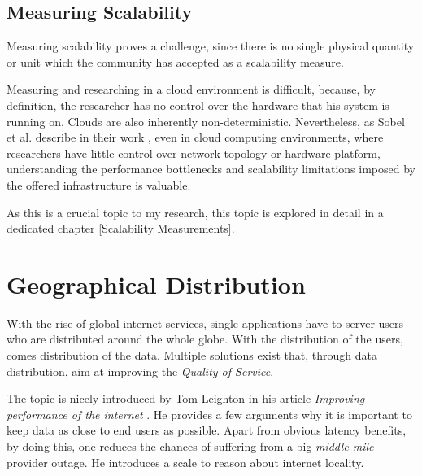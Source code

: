 \documentclass{uvamscse}
\begin{document}
\subsection{Measuring Scalability}
Measuring scalability proves a challenge, since there is no single physical quantity or unit which the community has accepted as a scalability measure.

Measuring and researching in a cloud environment is difficult, because, by definition, the researcher has no control over the hardware that his system is running on. Clouds are also inherently non-deterministic. Nevertheless, as Sobel et al. describe in their work \cite{Sobel}, even in cloud computing environments, where researchers have little control over network topology or hardware platform, understanding the performance bottlenecks and scalability limitations imposed by the offered infrastructure is valuable.

As this is a crucial topic to my research, this topic is explored in detail in a dedicated chapter \ref{Scalability Measurements}.

\section{Geographical Distribution}

With the rise of global internet services, single applications have to server users who are distributed around the whole globe. With the distribution of the users, comes distribution of the data. Multiple solutions exist that, through data distribution, aim at improving the \textit{Quality of Service}.

The topic is nicely introduced by Tom Leighton in his article \textit{Improving performance of the internet} \cite{Akamai}. He provides a few arguments why it is important to keep data as close to end users as possible. Apart from obvious latency benefits, by doing this, one reduces the chances of suffering from a big \textit{middle mile} provider outage.
He introduces a scale to reason about internet locality.
\end{document}
